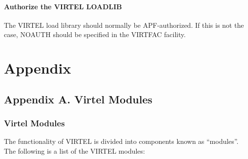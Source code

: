 \documentclass[letterpaper,10pt,english]{sphinxmanual}
\begin{document}
\ignorespaces 

\subsubsection{Authorize the VIRTEL LOADLIB}
\label{\detokenize{Installation_Guide:authorize-the-virtel-loadlib}}\label{\detokenize{Installation_Guide:index-186}}
The VIRTEL load library should normally be APF-authorized. If this is not the case, NOAUTH should be specified in the VIRTFAC facility.


\chapter{Appendix}
\label{\detokenize{Installation_Guide:appendix}}
\ignorespaces 

\section{Appendix A. Virtel Modules}
\label{\detokenize{Installation_Guide:appendix-a-virtel-modules}}\label{\detokenize{Installation_Guide:index-187}}

\subsection{Virtel Modules}
\label{\detokenize{Installation_Guide:virtel-modules}}
The functionality of VIRTEL is divided into components known as “modules”. The following is a list of the VIRTEL modules:

\end{document}
